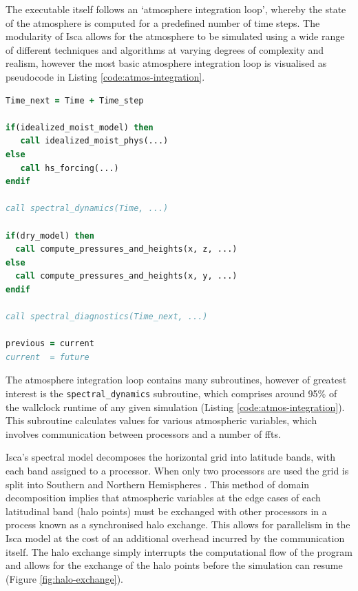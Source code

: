 \documentclass[a4paper,11pt]{report}
\begin{document}
\par
\par
The executable itself follows an `atmosphere integration loop', whereby the state of the atmosphere is computed for a predefined number of time steps. The modularity of Isca allows for the atmosphere to be simulated using a wide range of different techniques and algorithms at varying degrees of complexity and realism, however the most basic atmosphere integration loop is visualised as pseudocode in Listing \ref{code:atmos-integration}.

\begin{lstlisting}[language=Fortran,label={code:atmos-integration},caption={Pseudocode for the atmospheric integration loop found in Isca.}]
Time_next = Time + Time_step

if(idealized_moist_model) then
   call idealized_moist_phys(...)
else
   call hs_forcing(...)
endif

call spectral_dynamics(Time, ...)

if(dry_model) then
  call compute_pressures_and_heights(x, z, ...)
else
  call compute_pressures_and_heights(x, y, ...)
endif

call spectral_diagnostics(Time_next, ...)

previous = current
current  = future
\end{lstlisting}
\par
The atmosphere integration loop contains many subroutines, however of greatest interest is the \texttt{spectral\_dynamics} subroutine, which comprises around 95\% of the wallclock runtime of any given simulation (Listing \ref{code:atmos-integration}). This subroutine calculates values for various atmospheric variables, which involves  communication between processors and a number of \gls{fft}s. 
\par
Isca's spectral model decomposes the horizontal grid into latitude bands, with each band assigned to a processor. When only two processors are used the grid is split into Southern and Northern Hemispheres \cite{isca2019github}. This method of domain decomposition implies that atmospheric variables at the edge cases of each latitudinal band (halo points) must be exchanged with other processors in a process known as a synchronised halo exchange. This allows for parallelism in the Isca model at the cost of an additional overhead incurred by the communication itself. The halo exchange simply interrupts the computational flow of the program and allows for the exchange of the halo points before the simulation can resume (Figure \ref{fig:halo-exchange}).
\end{document}
